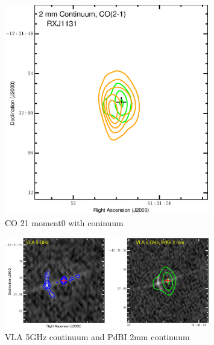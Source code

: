 \documentclass[]{emulateapj}
\begin{document}
\begin{figure}[tbph]
\centering
\includegraphics[width=0.8\textwidth]{../Figures/ContCO21.eps}	  
\caption{CO 21 moment0 with coninuum
 \label{fig:}}
\end{figure}

\begin{figure}[tbph]
\centering
\includegraphics[width=0.8\textwidth]{../Figures/Cont2mm_5GHz_double.eps}    
\caption{VLA 5GHz continuum and PdBI 2mm continuum
 \label{fig:}}
\end{figure}
\end{document}
